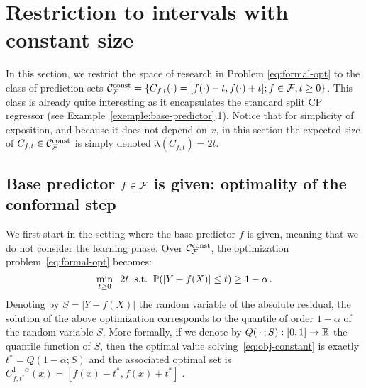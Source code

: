\section{Restriction to intervals with constant size}
\label{sec:constant}

In this section, we restrict the space of research in Problem \eqref{eq:formal-opt} to the class of prediction sets ${\cal C}^{\text{const}}_{\mathcal{F}} = \{C_{f,t}(\cdot) = [f(\cdot)-t, f(\cdot)+t]; f \in \mathcal{F}, t\geq0\}$. This class is already quite interesting as it encapsulates the standard split CP regressor (see Example~\ref{exemple:base-predictor}.1). Notice that for simplicity of exposition, and because it does not depend on $x$, in this section the expected size of $C_{f,t}\in{\cal C}^{\text{const}}_{\mathcal{F}}$ is simply denoted $\lambda(C_{f,t})=2t$. 

\subsection{Base predictor $f\in\mathcal{F}$ is given: optimality of the conformal step}
\label{sec:f-given}

We first start in the setting where the base predictor $f$ is given, meaning that we do not consider the learning phase. Over ${\cal C}^{\text{const}}_{\mathcal{F}}$, the optimization problem~\eqref{eq:formal-opt} becomes:
%
\begin{equation}
    \label{eq:obj-constant}
    \min_{t \geq 0} \hspace{0.2cm}  2t  \hspace{0.2cm}\text{s.t.}\hspace{0.2cm}  {\mathbb{P}}(|Y-f(X)|\leq t) \geq 1-\alpha\hspace{0.05cm}.
\end{equation}
%
Denoting by $S=|Y-f(X)|$ the random variable of the absolute residual, the solution of the above optimization corresponds to the quantile of order $1-\alpha$ of the random variable $S$. More formally, if we denote by $Q(\hspace{.2em} \cdot \hspace{.2em}  ; S):[0,1]\rightarrow {\mathbb{R}}$ the quantile function of $S$, then the optimal value solving~\eqref{eq:obj-constant} is exactly $t^*=Q(1-\alpha; S)$ and the associated optimal set is %
$C^{1-\alpha}_{f,t^*}(x) = [f(x) - t^*, f(x) + t^*] \; .$

